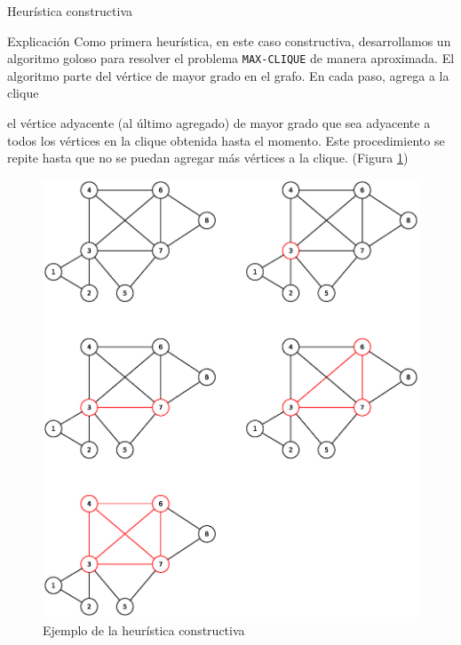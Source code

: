
\begin{section}{Heurística constructiva}
		\begin{subsection}{Explicación}
			Como primera heurística, en este caso constructiva, desarrollamos un algoritmo goloso para resolver el problema \texttt{MAX-CLIQUE} de manera aproximada. El algoritmo parte del vértice de mayor grado en el grafo. En cada paso, agrega a la clique

el vértice adyacente (al último agregado) de mayor grado que sea adyacente a todos los vértices en la clique obtenida hasta el momento. Este procedimiento se repite hasta que no se puedan agregar más vértices a la clique. (Figura \ref{fig:seguimiento_constructivo})
			
			\begin{figure}[H]
				\centering
		    	\includegraphics[scale=0.5]{constructivo/seguimiento.eps}
			    \caption{Ejemplo de la heurística constructiva}
			    \label{fig:seguimiento_constructivo}
			\end{figure}
			

\end{subsection}
\end{section}
